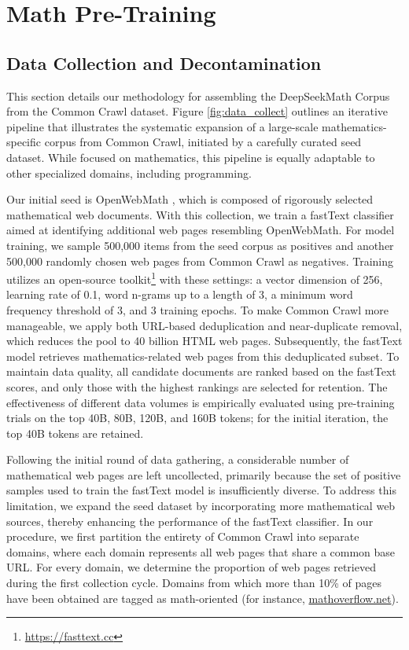 \section{Math Pre-Training}

\subsection{Data Collection and Decontamination} 
This section details our methodology for assembling the DeepSeekMath Corpus from the Common Crawl dataset. Figure \ref{fig:data_collect} outlines an iterative pipeline that illustrates the systematic expansion of a large-scale mathematics-specific corpus from Common Crawl, initiated by a carefully curated seed dataset. While focused on mathematics, this pipeline is equally adaptable to other specialized domains, including programming.

Our initial seed is OpenWebMath \citep{openwebmath}, which is composed of rigorously selected mathematical web documents. With this collection, we train a fastText classifier \citep{joulin2016fasttext} aimed at identifying additional web pages resembling OpenWebMath. For model training, we sample 500,000 items from the seed corpus as positives and another 500,000 randomly chosen web pages from Common Crawl as negatives. Training utilizes an open-source toolkit\footnote{\url{https://fasttext.cc}} with these settings: a vector dimension of 256, learning rate of 0.1, word n-grams up to a length of 3, a minimum word frequency threshold of 3, and 3 training epochs. To make Common Crawl more manageable, we apply both URL-based deduplication and near-duplicate removal, which reduces the pool to 40 billion HTML web pages. Subsequently, the fastText model retrieves mathematics-related web pages from this deduplicated subset. To maintain data quality, all candidate documents are ranked based on the fastText scores, and only those with the highest rankings are selected for retention. The effectiveness of different data volumes is empirically evaluated using pre-training trials on the top 40B, 80B, 120B, and 160B tokens; for the initial iteration, the top 40B tokens are retained.

Following the initial round of data gathering, a considerable number of mathematical web pages are left uncollected, primarily because the set of positive samples used to train the fastText model is insufficiently diverse. To address this limitation, we expand the seed dataset by incorporating more mathematical web sources, thereby enhancing the performance of the fastText classifier. In our procedure, we first partition the entirety of Common Crawl into separate domains, where each domain represents all web pages that share a common base URL. For every domain, we determine the proportion of web pages retrieved during the first collection cycle. Domains from which more than 10\% of pages have been obtained are tagged as math-oriented (for instance, \url{mathoverflow.net}).

